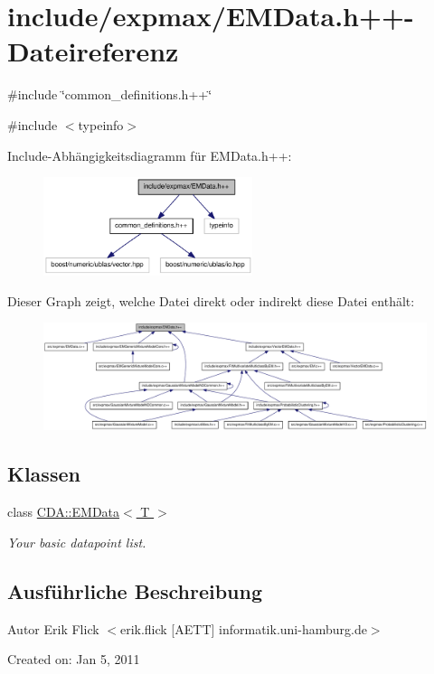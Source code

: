 \hypertarget{EMData_8h_09_09}{
\section{include/expmax/EMData.h++-\/Dateireferenz}
\label{EMData_8h_09_09}
}
{\ttfamily \#include \char`\"{}common\_\-definitions.h++\char`\"{}}\par
{\ttfamily \#include $<$typeinfo$>$}\par
Include-\/Abhängigkeitsdiagramm für EMData.h++:\nopagebreak
\begin{figure}[H]
\begin{center}
\leavevmode
\includegraphics[width=173pt]{EMData_8h_09_09__incl}
\end{center}
\end{figure}
Dieser Graph zeigt, welche Datei direkt oder indirekt diese Datei enthält:\nopagebreak
\begin{figure}[H]
\begin{center}
\leavevmode
\includegraphics[width=420pt]{EMData_8h_09_09__dep__incl}
\end{center}
\end{figure}
\subsection*{Klassen}
\begin{DoxyCompactItemize}
\item 
class \hyperlink{classCDA_1_1EMData}{CDA::EMData$<$ T $>$}
\begin{DoxyCompactList}\small\item\em Your basic datapoint list. \item\end{DoxyCompactList}\end{DoxyCompactItemize}


\subsection{Ausführliche Beschreibung}
\begin{DoxyAuthor}{Autor}
Erik Flick $<$erik.flick \mbox{[}AETT\mbox{]} informatik.uni-\/hamburg.de$>$
\end{DoxyAuthor}
Created on: Jan 5, 2011 